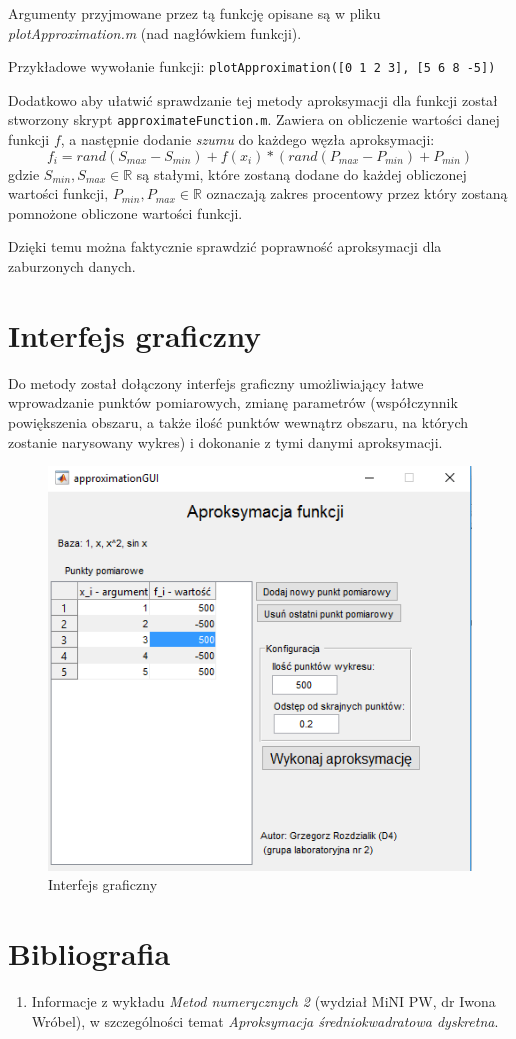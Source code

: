 \documentclass[12pt]{article}
\begin{document}
	Argumenty przyjmowane przez tą funkcję opisane są w pliku \textit{plotApproximation.m} (nad nagłówkiem funkcji).
	
	Przykładowe wywołanie funkcji:
	\texttt{plotApproximation([0 1 2 3], [5 6 8 -5])}
	
	Dodatkowo aby ułatwić sprawdzanie tej metody aproksymacji dla funkcji został stworzony skrypt \texttt{approximateFunction.m}. Zawiera on obliczenie wartości danej funkcji $f$, a następnie dodanie \textit{szumu} do każdego węzła aproksymacji:
	$$
	f_i = rand(S_{max} - S_{min}) +  f(x_i) * (rand(P_{max} - P_{min}) + P_{min})
	$$
	gdzie $S_{min}, S_{max} \in \mathbb{R}$ są stałymi, które zostaną dodane do każdej obliczonej wartości funkcji, $P_{min}, P_{max} \in \mathbb{R}$ oznaczają zakres procentowy przez który zostaną pomnożone obliczone wartości funkcji.
	
	Dzięki temu można faktycznie sprawdzić poprawność aproksymacji dla zaburzonych danych.
	
	
	\section{Interfejs graficzny}
	Do metody został dołączony interfejs graficzny umożliwiający łatwe wprowadzanie punktów pomiarowych, zmianę parametrów (współczynnik powiększenia obszaru, a także ilość punktów wewnątrz obszaru, na których zostanie narysowany wykres) i dokonanie z tymi danymi aproksymacji.
	
	\begin{figure}[H]
		\centering
		\includegraphics[scale=1]{images/gui.png}
		\caption{Interfejs graficzny}
		\label{GUI}
	\end{figure}
	
	
	
	\section{Bibliografia}
	\begin{enumerate}
		\item Informacje z wykładu \textit{Metod numerycznych 2} (wydział MiNI PW, dr Iwona Wróbel), w szczególności temat \textit{Aproksymacja średniokwadratowa dyskretna}.
	\end{enumerate}
	
\end{document}
